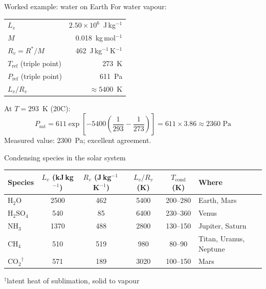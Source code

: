 \documentclass[aspectratio=169, 11pt]{beamer}
\begin{document}
\begin{frame}
\end{frame}

\begin{frame}{Worked example: water on Earth}
  For water vapour:
  \vskip4pt
  \centering
  \begin{tabular}{l r}
    \toprule
    $L_v$ & $2.50 \times 10^6$~J\,kg$^{-1}$ \\
    $M$ & 0.018~kg\,mol$^{-1}$ \\
    $R_v = R^*/M$ & 462~J\,kg$^{-1}$\,K$^{-1}$ \\
    $T_{\mathrm{ref}}$ (triple point) & 273~K \\
    $P_{\mathrm{ref}}$ (triple point) & 611~Pa \\
    \midrule
    $L_v/R_v$ & $\approx 5400$~K \\
    \bottomrule
  \end{tabular}
  \vskip8pt
  \flushleft
  At $T = 293$~K (20\textdegree{}C):
  $$P_{\mathrm{sat}} = 611 \exp\!\left[-5400\left(\frac{1}{293} - \frac{1}{273}\right)\right] = 611 \times 3.86 \approx 2360 \text{~Pa}$$
  Measured value: 2300~Pa; excellent agreement.
\end{frame}

\begin{frame}{Condensing species in the solar system}
  \centering
  \footnotesize
  \begin{tabular}{l c c c c l}
    \toprule
    \textbf{Species} & $L_v$ (kJ\,kg$^{-1}$) & $R_v$ (J\,kg$^{-1}$\,K$^{-1}$) & $L_v/R_v$ (K) & $T_{\mathrm{cond}}$ (K) & \textbf{Where} \\
    \midrule
    $\mathrm{H_2O}$      & 2500 & 462 & 5400 & 200--280 & Earth, Mars \\
    $\mathrm{H_2SO_4}$   & 540  & 85  & 6400 & 230--360 & Venus \\
    $\mathrm{NH_3}$      & 1370 & 488 & 2800 & 130--150 & Jupiter, Saturn \\
    $\mathrm{CH_4}$      & 510  & 519 & 980  & 80--90   & Titan, Uranus, Neptune \\
    $\mathrm{CO_2}^{\dagger}$ & 571  & 189 & 3020 & 100--150 & Mars \\
    \bottomrule
  \end{tabular}
  \vskip2pt
  {\scriptsize $^{\dagger}$latent heat of sublimation, solid to vapour}
  \vskip4pt
\end{frame}
\end{document}
